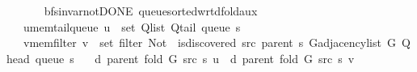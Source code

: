 \begin{isabellebody}
\ \ \ \ \isacommand{{\isachardot}{\kern0pt}}\isamarkupfalse%
\isanewline
{}\isamarkupfalse%
%
\endisatagproof
{\isafoldproof}%
%
\isadelimproof
\isanewline
%
\endisadelimproof
%
\isadeliminvisible
\isanewline
%
\endisadeliminvisible
%
\isataginvisible
{}\isamarkupfalse%
\ {\isacharparenleft}{\kern0pt}\ bfs{\isacharunderscore}{\kern0pt}invar{\isacharunderscore}{\kern0pt}not{\isacharunderscore}{\kern0pt}DONE{\isacharparenright}{\kern0pt}\ queue{\isacharunderscore}{\kern0pt}sorted{\isacharunderscore}{\kern0pt}wrt{\isacharunderscore}{\kern0pt}d{\isacharunderscore}{\kern0pt}fold{\isacharunderscore}{\kern0pt}aux{\isacharcolon}{\kern0pt}\isanewline
\ \ \ u{\isacharunderscore}{\kern0pt}mem{\isacharunderscore}{\kern0pt}tail{\isacharunderscore}{\kern0pt}queue{\isacharcolon}{\kern0pt}\ {\isachardoublequoteopen}u\ {\isasymin}\ set\ {\isacharparenleft}{\kern0pt}Q{\isacharunderscore}{\kern0pt}list\ {\isacharparenleft}{\kern0pt}Q{\isacharunderscore}{\kern0pt}tail\ {\isacharparenleft}{\kern0pt}queue\ s{\isacharparenright}{\kern0pt}{\isacharparenright}{\kern0pt}{\isacharparenright}{\kern0pt}{\isachardoublequoteclose}\isanewline
\ \ \ v{\isacharunderscore}{\kern0pt}mem{\isacharunderscore}{\kern0pt}filter{\isacharcolon}{\kern0pt}\ {\isachardoublequoteopen}v\ {\isasymin}\ set\ {\isacharparenleft}{\kern0pt}filter\ {\isacharparenleft}{\kern0pt}Not\ {\isasymcirc}\ is{\isacharunderscore}{\kern0pt}discovered\ src\ {\isacharparenleft}{\kern0pt}parent\ s{\isacharparenright}{\kern0pt}{\isacharparenright}{\kern0pt}\ {\isacharparenleft}{\kern0pt}G{\isachardot}{\kern0pt}adjacency{\isacharunderscore}{\kern0pt}list\ G\ {\isacharparenleft}{\kern0pt}Q{\isacharunderscore}{\kern0pt}head\ {\isacharparenleft}{\kern0pt}queue\ s{\isacharparenright}{\kern0pt}{\isacharparenright}{\kern0pt}{\isacharparenright}{\kern0pt}{\isacharparenright}{\kern0pt}{\isachardoublequoteclose}\isanewline
\ \ \ {\isachardoublequoteopen}d\ {\isacharparenleft}{\kern0pt}parent\ {\isacharparenleft}{\kern0pt}fold\ G\ src\ s{\isacharparenright}{\kern0pt}{\isacharparenright}{\kern0pt}\ u\ {\isasymle}\ d\ {\isacharparenleft}{\kern0pt}parent\ {\isacharparenleft}{\kern0pt}fold\ G\ src\ s{\isacharparenright}{\kern0pt}{\isacharparenright}{\kern0pt}\ v{\isachardoublequoteclose}%
\endisataginvisible
{\isafoldinvisible}%
%
\isadeliminvisible
\isanewline
%
\endisadeliminvisible
%
\isadelimproof
%
\endisadelimproof
%
\isatagproof
{}\isamarkupfalse%
\ {\isacharminus}{\kern0pt}\isanewline
\ \ \isamarkupfalse%

\end{isabellebody}
